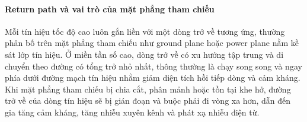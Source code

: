                     \paragraph{Return path và vai trò của mặt phẳng tham chiếu}
                        Mỗi tín hiệu tốc độ cao luôn gắn liền với một dòng trở về tương ứng, thường phân bố trên mặt phẳng tham chiếu như ground plane hoặc power plane nằm kề sát lớp tín hiệu. Ở miền tần số cao, dòng trở về có xu hướng tập trung và di chuyển theo đường có tổng trở nhỏ nhất, thông thường là chạy song song và ngay phía dưới đường mạch tín hiệu nhằm giảm diện tích hồi tiếp dòng và cảm kháng. Khi mặt phẳng tham chiếu bị chia cắt, phân mảnh hoặc tồn tại khe hở, đường trở về của dòng tín hiệu sẽ bị gián đoạn và buộc phải đi vòng xa hơn, dẫn đến gia tăng cảm kháng, tăng nhiễu xuyên kênh và phát xạ nhiễu điện từ.


                        
                        
